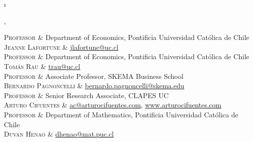 \documentclass[a4paper, 10pt]{article}
\newcommand{\tablength}{}
\newcommand{\setCols}[1]{			%
	\ifnum0=\i						%
		\ifdim0cm=#1				%
			\def \firstCol {r}		%
		\else						%
			\def \firstCol {p{#1}}		%
		\fi						%
	\else \ifnum1=\i				%
		\ifdim0cm=#1				%
			\def \secondCol {l}		%
		\else						%
			\def \secondCol{p{#1}}	%
		\fi						%
	\else \ifnum2=\i				%
		\ifnum0=#1				%
			\def \sep {}			%
		\else						%
			\def \sep {|}			%
		\fi						%
	\fi \fi \fi						%
	\advance\i by1					%
}
\newcommand{\tab}[1]{					%
	\newcount\i						%
	\forlistloop{\setCols}{\tablength}		%
	\begin{tabular}{\firstCol \sep \secondCol}	%
		#1							%
	\end{tabular} \\						%
}
\begin{document}
\tab{
\textsc{Professor}
	&	Department of Economics, Pontificia Universidad Católica de Chile		\\[0.2ex]
\textsc{Jeanne Lafortune}
	& 	\href{mailto:jlafortune@uc.cl}{jlafortune@uc.cl}					\\[1.5ex]

\textsc{Professor}
	&	Department of Economics, Pontificia Universidad Católica de Chile		\\[0.2ex]
\textsc{Tomás Rau}
	& 	\href{mailto:trau@uc.cl}{trau@uc.cl}							\\[1.5ex]

\textsc{Professor}
	&	Associate Professor, SKEMA Business School				\\[0.2ex]
\textsc{Bernardo Pagnoncelli}
	& 	\href{mailto:bernardo.pagnoncelli@skema.edu}{bernardo.pagnoncelli@skema.edu}	\\[1.5ex]

\textsc{Professor}
	&	Senior Research Associate, CLAPES UC	 					\\[0.2ex]
\textsc{Arturo Cifuentes}
	& 	\href{mailto:ac@arturocifuentes.com}{ac@arturocifuentes.com}, \href{http://www.arturocifuentes.com/}{www.arturocifuentes.com}		\\[1.5ex]

\textsc{Professor}
	&	Department of Mathematics, Pontificia Universidad Católica de Chile	\\[0.2ex]
\textsc{Duvan Henao}
	& 	\href{mailto:dhenao@mat.puc.cl}{dhenao@mat.puc.cl}			\\[1.5ex]
}
\end{document}
